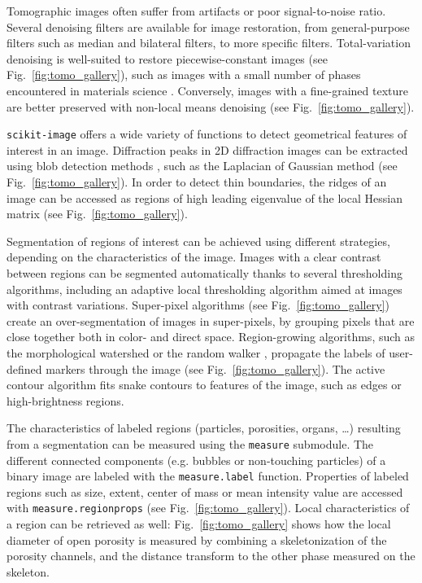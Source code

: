\documentclass[twocolumn]{bmcart}%
\begin{document}
Tomographic images often suffer from artifacts or poor signal-to-noise
ratio. Several denoising filters are available for image restoration,
from general-purpose filters such as median and bilateral filters, to
more specific filters. Total-variation denoising \citep{Chambolle2004,
Getreuer2012} is well-suited to restore piecewise-constant images (see
Fig.~\ref{fig:tomo_gallery}), such as images with a small number of
phases encountered in materials science \citep{Bouttes2015}. Conversely,
images with a fine-grained texture are better preserved with non-local
means denoising \citep{Buades2005} (see Fig.~\ref{fig:tomo_gallery}).

\texttt{scikit-image} offers a wide variety of functions to detect
geometrical features of interest in an image. Diffraction peaks in 2D
diffraction images can be extracted using blob detection methods
\citep{Ashiotis2015}, such as the Laplacian of Gaussian method (see
Fig.~\ref{fig:tomo_gallery}). In order to detect thin boundaries, the
ridges of an image can be accessed as regions of high leading eigenvalue
of the local Hessian matrix (see Fig.~\ref{fig:tomo_gallery}).

Segmentation of regions of interest can be achieved using different
strategies, depending on the characteristics of the image. Images with a
clear contrast between regions can be segmented automatically thanks to
several thresholding algorithms, including an adaptive local thresholding
algorithm aimed at images with contrast variations. Super-pixel
algorithms \citep{Felzenszwalb2004, Achanta2012} (see
Fig.~\ref{fig:tomo_gallery}) create an over-segmentation of images in
super-pixels, by grouping pixels that are close together both in color-
and direct space. Region-growing algorithms, such as the morphological
watershed or the random walker \citep{Grady2006}, propagate the labels
of user-defined markers through the image (see
Fig.~\ref{fig:tomo_gallery}). The active contour
algorithm \citep{Kass1988} fits snake contours to features of the
image, such as edges or high-brightness regions.

The characteristics of labeled regions (particles, porosities, organs,
\dots) resulting from a segmentation can be measured using the
\texttt{measure} submodule. The different connected components (e.g.
bubbles or non-touching particles) of a binary image are labeled with the
\texttt{measure.label} function. Properties of labeled regions such as
size, extent, center of mass or mean intensity value are accessed with
\texttt{measure.regionprops} (see Fig.~\ref{fig:tomo_gallery}). Local
characteristics of a region can be retrieved as well:
Fig.~\ref{fig:tomo_gallery} shows how the local diameter of open
porosity is measured by combining a skeletonization of the porosity
channels, and the distance transform to the other phase measured on the
skeleton.   
\end{document}
